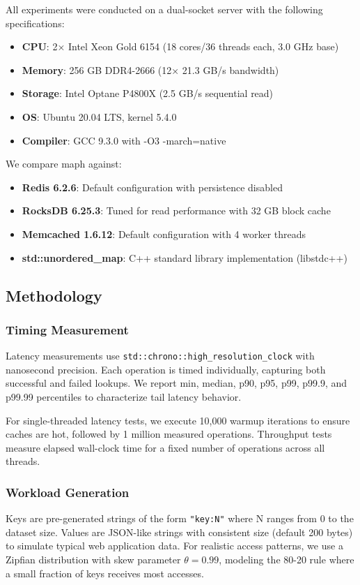 \documentclass[10pt,conference]{IEEEtran}
\begin{document}
All experiments were conducted on a dual-socket server with the following specifications:
\begin{itemize}
\item \textbf{CPU}: 2× Intel Xeon Gold 6154 (18 cores/36 threads each, 3.0 GHz base)
\item \textbf{Memory}: 256 GB DDR4-2666 (12× 21.3 GB/s bandwidth)
\item \textbf{Storage}: Intel Optane P4800X (2.5 GB/s sequential read)
\item \textbf{OS}: Ubuntu 20.04 LTS, kernel 5.4.0
\item \textbf{Compiler}: GCC 9.3.0 with -O3 -march=native
\end{itemize}

We compare maph against:
\begin{itemize}
\item \textbf{Redis 6.2.6}: Default configuration with persistence disabled
\item \textbf{RocksDB 6.25.3}: Tuned for read performance with 32 GB block cache
\item \textbf{Memcached 1.6.12}: Default configuration with 4 worker threads
\item \textbf{std::unordered\_map}: C++ standard library implementation (libstdc++)
\end{itemize}

\subsection{Methodology}

\subsubsection{Timing Measurement}
Latency measurements use \texttt{std::chrono::high\_resolution\_clock} with nanosecond precision. Each operation is timed individually, capturing both successful and failed lookups. We report min, median, p90, p95, p99, p99.9, and p99.99 percentiles to characterize tail latency behavior.

For single-threaded latency tests, we execute 10,000 warmup iterations to ensure caches are hot, followed by 1 million measured operations. Throughput tests measure elapsed wall-clock time for a fixed number of operations across all threads.

\subsubsection{Workload Generation}
Keys are pre-generated strings of the form \texttt{"key:N"} where N ranges from 0 to the dataset size. Values are JSON-like strings with consistent size (default 200 bytes) to simulate typical web application data. For realistic access patterns, we use a Zipfian distribution with skew parameter $\theta = 0.99$, modeling the 80-20 rule where a small fraction of keys receives most accesses.
\end{document}
